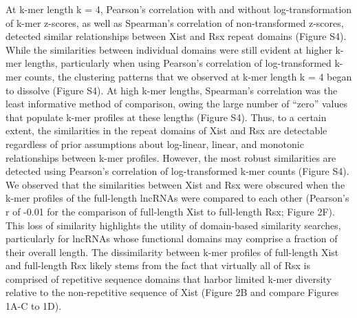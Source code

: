 At k-mer length k = 4, Pearson’s correlation with and without log-transformation of k-mer z-scores, as well as Spearman’s correlation of non-transformed z-scores, detected similar relationships between Xist and Rsx repeat domains (Figure S4). While the similarities between individual domains were still evident at higher k-mer lengths, particularly when using Pearson’s correlation of log-transformed k-mer counts, the clustering patterns that we observed at k-mer length k = 4 began to dissolve (Figure S4). At high k-mer lengths, Spearman’s correlation was the least informative method of comparison, owing the large number of “zero” values that populate k-mer profiles at these lengths (Figure S4). Thus, to a certain extent, the similarities in the repeat domains of Xist and Rsx are detectable regardless of prior assumptions about log-linear, linear, and monotonic relationships between k-mer profiles. However, the most robust similarities are detected using Pearson’s correlation of log-transformed k-mer counts (Figure S4).
We observed that the similarities between Xist and Rsx were obscured when the k-mer profiles of the full-length lncRNAs were compared to each other (Pearson’s r of -0.01 for the comparison of full-length Xist to full-length Rsx; Figure 2F). This loss of similarity highlights the utility of domain-based similarity searches, particularly for lncRNAs whose functional domains may comprise a fraction of their overall length. The dissimilarity between k-mer profiles of full-length Xist and full-length Rsx likely stems from the fact that virtually all of Rsx is comprised of repetitive sequence domains that harbor limited k-mer diversity relative to the non-repetitive sequence of Xist (Figure 2B and compare Figures 1A-C to 1D). 

